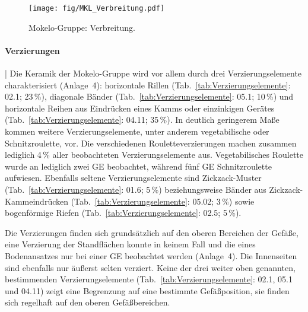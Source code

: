 \begin{figure*}[p]
\centering
\texttt{[image: fig/MKL\_Verbreitung.pdf]}
\caption{Mokelo-Gruppe: Verbreitung.}
\label{fig:MKL_Verbreitung}
\end{figure*}

\paragraph{Verzierungen}\hspace{-.5em}|\hspace{.5em}%
Die Keramik der Mokelo-Gruppe wird vor allem durch drei Verzierungselemente charakterisiert (Anlage~4): horizontale Rillen (Tab.~\ref{tab:Verzierungselemente}: 02.1; 23\,\%), diagonale Bänder (Tab.~\ref{tab:Verzierungselemente}: 05.1; 10\,\%) und horizontale Reihen aus Eindrücken eines Kamms oder einzinkigen Gerätes (Tab.~\ref{tab:Verzierungselemente}: 04.11; 35\,\%). In deutlich geringerem Maße kommen weitere Verzierungselemente, unter anderem vegetabilische oder Schnitzroulette, vor. Die verschiedenen Rouletteverzierungen machen zusammen lediglich 4\,\% aller beobachteten Verzierungselemente aus. Vegetabilisches \mbox{Roulette} wurde an lediglich zwei GE beobachtet, während fünf GE Schnitzroulette aufwiesen. Ebenfalls seltene Verzierungselemente sind Zickzack-Muster (Tab.~\ref{tab:Verzierungselemente}: 01.6; 5\,\%) beziehungsweise Bänder aus Zickzack-Kammeindrücken (Tab.~\ref{tab:Verzierungselemente}: 05.02; 3\,\%) sowie bogenförmige Riefen (Tab.~\ref{tab:Verzierungselemente}: 02.5; 5\,\%).

Die Verzierungen finden sich grundsätzlich auf den oberen Bereichen der Gefäße, eine Verzierung der Standflächen konnte in keinem Fall und die eines Bodenansatzes nur bei einer GE beobachtet werden (Anlage~4). Die Innenseiten sind ebenfalls nur äußerst selten verziert. Keine der drei weiter oben genannten, bestimmenden Verzierungselemente (Tab.~\ref{tab:Verzierungselemente}: 02.1, 05.1 und 04.11) zeigt eine Begrenzung auf eine bestimmte Gefäßposition, sie finden sich regelhaft auf den oberen Gefäßbereichen.


